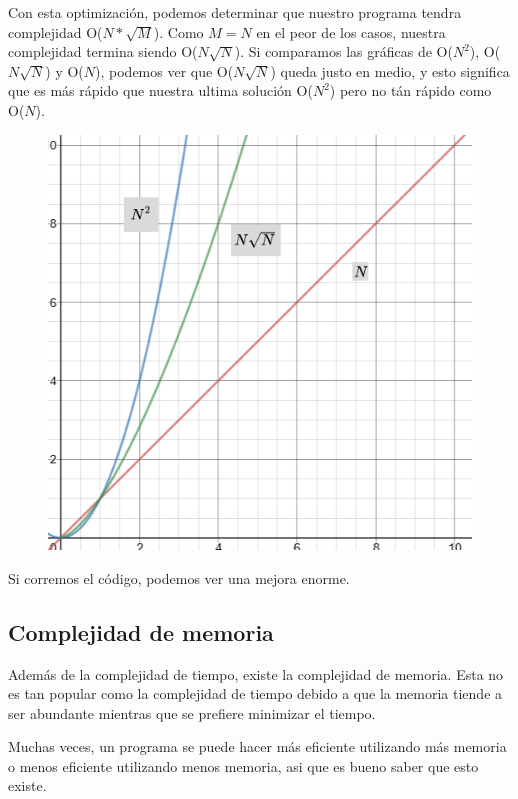 \documentclass{article}
\begin{document}
Con esta optimización, podemos determinar que nuestro programa tendra complejidad O($N * \sqrt{M}$). Como $M = N$ en el peor de los casos, nuestra complejidad termina siendo O($N \sqrt{N}$). Si comparamos las gráficas de O($N^2$), O($N \sqrt{N}$) y O($N$), podemos ver que O($N \sqrt{N}$) queda justo en medio, y esto significa que es más rápido que nuestra ultima solución O($N^2$) pero no tán rápido como O($N$).

\begin{figure}[H]
    \centering
    \includegraphics[width=0.3\paperwidth]{nsquaredn}
\end{figure}

Si corremos el código, podemos ver una mejora enorme.

\subsection{Complejidad de memoria}

Además de la complejidad de tiempo, existe la complejidad de memoria. Esta no es tan popular como la complejidad de tiempo debido a que la memoria tiende a ser abundante mientras que se prefiere minimizar el tiempo.

Muchas veces, un programa se puede hacer más eficiente utilizando más memoria o menos eficiente utilizando menos memoria, asi que es bueno saber que esto existe.
\end{document}
